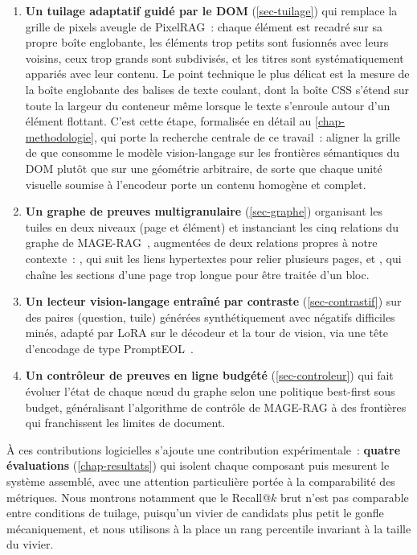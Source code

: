 \begin{enumerate}
\item \textbf{Un tuilage adaptatif guidé par le DOM} (\cref{sec-tuilage}) qui
remplace la grille de pixels aveugle de PixelRAG~: chaque élément est recadré
sur sa propre boîte englobante, les éléments trop petits sont fusionnés avec
leurs voisins, ceux trop grands sont subdivisés, et les titres sont
systématiquement appariés avec leur contenu. Le point technique le plus
délicat est la mesure de la boîte englobante des balises de
texte coulant, dont la boîte CSS s'étend sur toute la largeur du conteneur
même lorsque le texte s'enroule autour d'un élément flottant. C'est cette
étape, formalisée en détail au \cref{chap-methodologie}, qui porte
la recherche centrale de ce travail~: aligner la grille de 
que consomme le modèle vision-langage sur les frontières sémantiques du DOM
plutôt que sur une géométrie arbitraire, de sorte que chaque unité visuelle
soumise à l'encodeur porte un contenu homogène et complet.

\item \textbf{Un graphe de preuves multigranulaire} (\cref{sec-graphe})
organisant les tuiles en deux niveaux (page et élément) et instanciant les cinq
relations du graphe de MAGE-RAG~\citep{magerag2026}, augmentées de deux
relations propres à notre contexte~: , qui suit les liens
hypertextes pour relier plusieurs pages, et , qui chaîne les
sections d'une page trop longue pour être traitée d'un bloc.

\item \textbf{Un lecteur vision-langage entraîné par contraste}
(\cref{sec-contrastif}) sur des paires (question, tuile) générées
synthétiquement avec négatifs difficiles minés, adapté par LoRA sur le décodeur
et la tour de vision, via une tête d'encodage de type
PromptEOL~\citep{prompteol2024}.

\item \textbf{Un contrôleur de preuves en ligne budgété} (\cref{sec-controleur})
qui fait évoluer l'état de chaque nœud du graphe selon une politique
best-first sous budget, généralisant l'algorithme de contrôle de MAGE-RAG à des
frontières qui franchissent les limites de document.
\end{enumerate}

À ces contributions logicielles s'ajoute une contribution expérimentale~:
\textbf{quatre évaluations} (\cref{chap-resultats}) qui isolent chaque
composant puis mesurent le système assemblé, avec une attention particulière
portée à la comparabilité des métriques. Nous montrons notamment que le
Recall@$k$ brut n'est pas comparable entre conditions de tuilage, puisqu'un
vivier de candidats plus petit le gonfle mécaniquement, et nous utilisons à la
place un rang percentile invariant à la taille du vivier.

